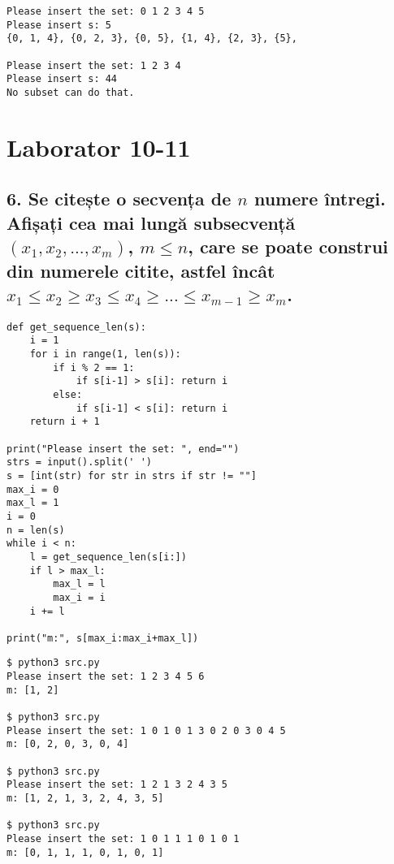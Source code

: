 \documentclass[11pt]{article}
\begin{document}
\begin{itemize}
\begin{itemize}
\begin{verbatim}
Please insert the set: 0 1 2 3 4 5
Please insert s: 5
{0, 1, 4}, {0, 2, 3}, {0, 5}, {1, 4}, {2, 3}, {5}, 

Please insert the set: 1 2 3 4
Please insert s: 44
No subset can do that.
\end{verbatim}

\pagebreak

\section*{Laborator 10-11}
\label{sec:org49432b2}
\subsection*{6. Se citește o secvența de \(n\) numere întregi. Afișați cea mai lungă subsecvență \((x_1, x_2,..., x_m)\), \(m \le n\), care se poate construi din numerele citite, astfel încât \(x_1 \le x_2 \ge x_3 \le x_4 \ge ... \le x_{m-1} \ge x_m\).}
\label{sec:org138afdd}
\begin{verbatim}
def get_sequence_len(s):
    i = 1
    for i in range(1, len(s)):
        if i % 2 == 1:
            if s[i-1] > s[i]: return i
        else:
            if s[i-1] < s[i]: return i
    return i + 1

print("Please insert the set: ", end="")
strs = input().split(' ')
s = [int(str) for str in strs if str != ""]
max_i = 0
max_l = 1
i = 0
n = len(s)
while i < n:
    l = get_sequence_len(s[i:])
    if l > max_l:
        max_l = l
        max_i = i
    i += l

print("m:", s[max_i:max_i+max_l])

\end{verbatim}
\begin{verbatim}
$ python3 src.py
Please insert the set: 1 2 3 4 5 6
m: [1, 2]

$ python3 src.py
Please insert the set: 1 0 1 0 1 3 0 2 0 3 0 4 5
m: [0, 2, 0, 3, 0, 4]

$ python3 src.py
Please insert the set: 1 2 1 3 2 4 3 5
m: [1, 2, 1, 3, 2, 4, 3, 5]

$ python3 src.py
Please insert the set: 1 0 1 1 1 0 1 0 1
m: [0, 1, 1, 1, 0, 1, 0, 1]
\end{verbatim}

\pagebreak

\end{itemize}
\end{itemize}
\end{document}
